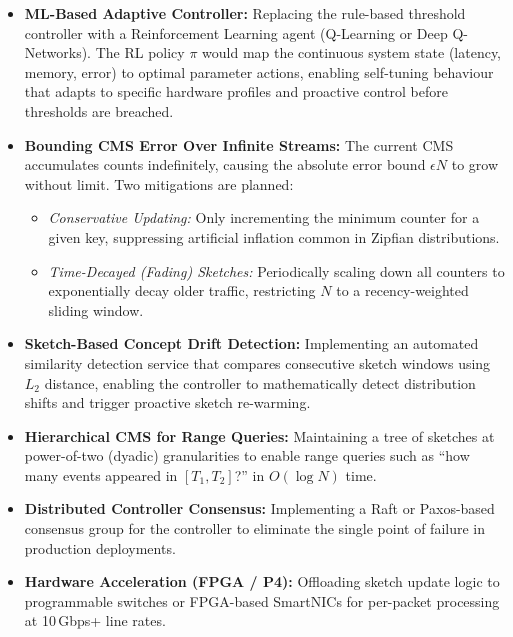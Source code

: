 \begin{itemize}
    \item \textbf{ML-Based Adaptive Controller:} Replacing the rule-based threshold controller with a Reinforcement Learning agent (Q-Learning or Deep Q-Networks). The RL policy $\pi$ would map the continuous system state (latency, memory, error) to optimal parameter actions, enabling self-tuning behaviour that adapts to specific hardware profiles and proactive control before thresholds are breached.

    \item \textbf{Bounding CMS Error Over Infinite Streams:} The current CMS accumulates counts indefinitely, causing the absolute error bound $\epsilon N$ to grow without limit. Two mitigations are planned:
    \begin{itemize}
        \item \textit{Conservative Updating:} Only incrementing the minimum counter for a given key, suppressing artificial inflation common in Zipfian distributions.
        \item \textit{Time-Decayed (Fading) Sketches:} Periodically scaling down all counters to exponentially decay older traffic, restricting $N$ to a recency-weighted sliding window.
    \end{itemize}

    \item \textbf{Sketch-Based Concept Drift Detection:} Implementing an automated similarity detection service that compares consecutive sketch windows using $L_2$ distance, enabling the controller to mathematically detect distribution shifts and trigger proactive sketch re-warming.

    \item \textbf{Hierarchical CMS for Range Queries:} Maintaining a tree of sketches at power-of-two (dyadic) granularities to enable range queries such as ``how many events appeared in $[T_1, T_2]$?'' in $O(\log N)$ time.

    \item \textbf{Distributed Controller Consensus:} Implementing a Raft or Paxos-based consensus group for the controller to eliminate the single point of failure in production deployments.

    \item \textbf{Hardware Acceleration (FPGA / P4):} Offloading sketch update logic to programmable switches or FPGA-based SmartNICs for per-packet processing at 10\,Gbps+ line rates.
\end{itemize}
 